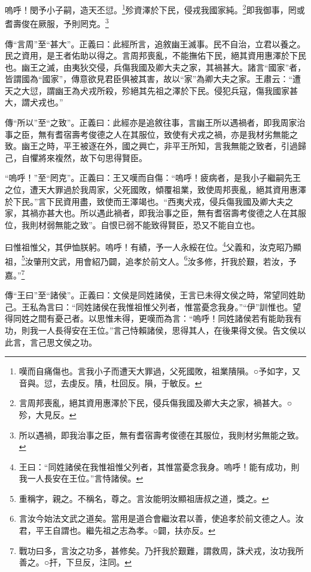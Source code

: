 嗚呼！閔予小子嗣，造天丕愆。\footnote{嘆而自痛傷也。言我小子而遭天大罪過，父死國敗，祖業隤隕。○予如字，又音與。愆，去虔反。隤，杜回反。隕，于敏反。}殄資澤於下民，侵戎我國家純。\footnote{言周邦喪亂，絕其資用惠澤於下民，侵兵傷我國及卿大夫之家，禍甚大。○殄，大見反。}即我御事，罔或耆壽俊在厥服，予則罔克。\footnote{所以遇禍，即我治事之臣，無有耆宿壽考俊德在其服位，我則材劣無能之致。}


{\noindent\zhuan{}\fzbyks 傳“言周”至“甚大”。正義曰：此經所言，追敘幽王滅事。民不自治，立君以養之。民之資用，是王者佑助以得之。言周邦喪亂，不能撫佑下民，絕其資用惠澤於下民也。幽王之滅，由夷狄交侵，兵傷我國及卿大夫之家，其禍甚大。諸言“國家”者，皆謂國為“國家”，傳意欲見君臣俱被其害，故以“家”為卿大夫之家。王肅云：“遭天之大愆，謂幽王為犬戎所殺，殄絕其先祖之澤於下民。侵犯兵寇，傷我國家甚大，謂犬戎也。” \par}

{\noindent\zhuan{}\fzbyks 傳“所以”至“之致”。正義曰：此經亦是追敘往事，言幽王所以遇禍者，即我周家治事之臣，無有耆宿壽考俊德之人在其服位，致使有犬戎之禍，亦是我材劣無能之致。幽王之時，平王被逐在外，國之興亡，非平王所知，言我無能之致者，引過歸己，自懼將來複然，故下句思得賢臣。 \par}

{\noindent\shu{}\fzkt “嗚呼！”至“罔克”。正義曰：王又嘆而自傷：“嗚呼！疲病者，是我小子繼嗣先王之位，遭天大罪過於我周家，父死國敗，傾覆祖業，致使周邦喪亂，絕其資用惠澤於下民。”言下民資用盡，致使而王澤竭也。“西夷犬戎，侵兵傷我國及卿大夫之家，其禍亦甚大也。所以遇此禍者，即我治事之臣，無有耆宿壽考俊德之人在其服位，我則材弱無能之致”。自恨已弱不能致得賢臣，恐又不能自立也。 \par}

曰惟祖惟父，其伊恤朕躬。嗚呼！有績，予一人永綏在位。\footnote{王曰：“同姓諸侯在我惟祖惟父列者，其惟當憂念我身。嗚呼！能有成功，則我一人長安在王位。”言恃諸侯。}父義和，汝克昭乃顯祖，\footnote{重稱字，親之。不稱名，尊之。言汝能明汝顯祖唐叔之道，獎之。}汝肇刑文武，用會紹乃闢，追孝於前文人。\footnote{言汝今始法文武之道矣。當用是道合會繼汝君以善，使追孝於前文德之人。汝君，平王自謂也。繼先祖之志為孝。○闢，扶亦反。}汝多修，扞我於艱，若汝，予嘉。”\footnote{戰功曰多，言汝之功多，甚修矣。乃扞我於艱難，謂救周，誅犬戎，汝功我所善之。○扞，下旦反，注同。}


{\noindent\zhuan{}\fzbyks 傳“王曰”至“諸侯”。正義曰：文侯是同姓諸侯，王言已未得文侯之時，常望同姓助己。王私為言曰：“同姓諸侯在我惟祖惟父列者，惟當憂念我身。”“伊”訓惟也。望得同姓之間有憂己者。以思惟未得，更嘆而為言：“嗚呼！同姓諸侯若有能助我有功，則我一人長得安在王位。”言己恃賴諸侯，思得其人，在後果得文侯。告文侯以此言，言己思文侯之功。 \par}

